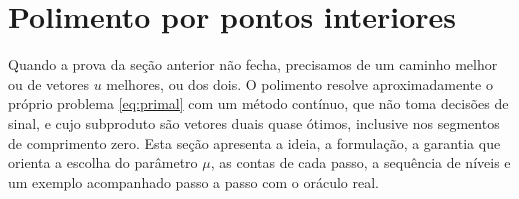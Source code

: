 \documentclass[11pt,a4paper]{article}
\theoremstyle{plain}\newtheorem{proposicao}{Proposição}
\theoremstyle{definition}\newtheorem{definicao}{Definição}
\theoremstyle{plain}\newtheorem{teorema}{Teorema}
\begin{document}
\section{Polimento por pontos interiores}\label{sec:polimento}
Quando a prova da seção anterior não fecha, precisamos de um caminho melhor ou de vetores \(u\) melhores, ou dos dois. O polimento resolve aproximadamente o próprio problema \eqref{eq:primal} com um método contínuo, que não toma decisões de sinal, e cujo subproduto são vetores duais quase ótimos, inclusive nos segmentos de comprimento zero. Esta seção apresenta a ideia, a formulação, a garantia que orienta a escolha do parâmetro \(\mu\), as contas de cada passo, a sequência de níveis e um exemplo acompanhado passo a passo com o oráculo real.
\end{document}
